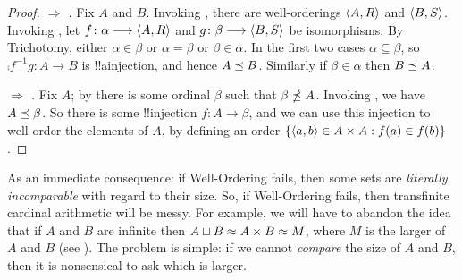\documentclass[../../../include/open-logic-section]{subfiles}
\begin{document}
\begin{proof}
\emph{ $\Rightarrow$ .} Fix $A$ and
$B$. Invoking , there are well-orderings $\langle A, R \rangle$
and $\langle B, S \rangle$. Invoking
, let $f \colon
\alpha \longrightarrow \langle A, R \rangle$ and $g \colon \beta \longrightarrow \langle B, S \rangle$ be
isomorphisms. By Trichotomy, either $\alpha \in \beta$ or $\alpha =
\beta$ or $\beta \in \alpha$. In the first two cases $\alpha \subseteq
\beta$, so 
$\comp{f^{-1}}{g} \colon A \to B$ is !!a{injection}, and hence
$A \preceq B$. Similarly if $\beta \in \alpha$ then $B \preceq A$.

\emph{ $\Rightarrow$ .} Fix $A$; by
 there is some ordinal $\beta$ such that
$\beta \npreceq A$. Invoking , we have
$A \preceq \beta$. So there is some !!{injection} $f \colon A \to
\beta$, and we can use this injection to well-order the elements of
$A$, by defining an order $\{ \langle a, b \rangle \in A \times A : f(a)
\in f(b) \}$.
\end{proof}

As an immediate consequence: if Well-Ordering fails, then some sets
are \emph{literally incomparable} with regard to their size. So, if
Well-Ordering fails, then transfinite cardinal arithmetic will be
messy. For example, we will have to abandon the idea that if $A$ and
$B$ are infinite then $A \sqcup B \approx A \times
B \approx M$, where $M$ is the larger of $A$ and $B$ (see
). The problem is
simple: if we cannot \emph{compare} the size of  $A$ and $B$, then it
is nonsensical to ask which is larger.
\end{document}
